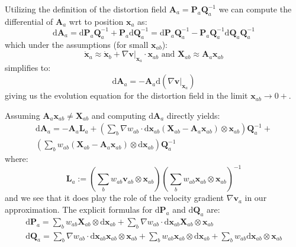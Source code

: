 \documentclass[oneside, a4paper, onecolumn, 11pt]{article}
\renewcommand{\AA}{\mathbf{A}}
\newcommand{\PP}{\mathbf{P}}
\newcommand{\vv}{\mathbf{v}}
\newcommand{\xx}{\mathbf{x}}
\newcommand{\XX}{\mathbf{X}}
\newcommand{\diff}{\mathrm{d}}
\newcommand{\QQ}{\mathbf{Q}}
\newcommand{\LL}{\mathbf{L}}
\begin{document}
\begin{section}
\begin{subsection}
Utilizing the definition of the distortion field $\AA_{a}= \PP_{a} \QQ_a^{-1}$ 
we can compute the differential of $\AA_a$ wrt to position $\xx_a$ as:
\[
    \diff \AA_a = \diff \PP_a \QQ_a^{-1} + \PP_a \diff \QQ_a^{-1} =
    \diff \PP_a \QQ_a^{-1} - \PP_a \QQ_a^{-1} \diff \QQ_a \QQ_a^{-1} 
\]
which under the assumptions (for small $\xx_{ab}$):
\[
    \dot{\xx}_a \approx \dot{\xx}_b + \nabla \vv \Big|_{\xx_a} \cdot \xx_{ab} \text{ and } 
    \XX_{ab} \approx \AA_a \xx_{ab}
\]
simplifies to: 
\[
    \diff \AA_a = - \AA_a \diff (\nabla \vv |_{\xx_a})%
\]
giving us the evolution equation for the distortion field  in the limit $\xx_{ab} \rightarrow 0+$.

Assuming $\AA_{a} \xx_{ab} \neq \XX_{ab}$ and computing $\diff \AA_a$ directly yields:
\begin{equation}\label{eq:dA_full}
    \begin{aligned}
    \diff \AA_a = - \AA_a \LL_a +
    \left(\sum_b \nabla w_{ab} \cdot \diff \xx_{ab} \left(\XX_{ab} - \AA_a \xx_{ab}
    \right) \otimes \xx_{ab}\right)\QQ_a^{-1} +\\
    \left(\sum_b w_{ab} \left(\XX_{ab} - \AA_a \xx_{ab}
    \right) \otimes \diff \xx_{ab}\right)\QQ_a^{-1}
    \end{aligned}
\end{equation}
where:
\begin{equation}
    \LL_a := \left( \sum_b w_{ab} \vv_{ab} \otimes \xx_{ab}\right)
    \left( \sum_b w_{ab} \xx_{ab} \otimes \xx_{ab}\right)^{-1}
\end{equation}
and we see that it does play the role of the velocity gradient $\nabla \vv_a$ in our approximation.
The explicit formulas for $\diff \PP_{a}$ and $\diff \QQ_a$ are:
\[
    \begin{aligned}
    \diff \PP_{a} = \sum_{b} w_{ab} \XX_{ab} \otimes \diff \xx_{ab} +
    \sum_{b} \nabla w_{ab} \cdot \diff \xx_{ab} \XX_{ab} \otimes \xx_{ab} \\
    \diff \QQ_{a} = \sum_{b} \nabla w_{ab} \cdot \diff \xx_{ab} \xx_{ab} \otimes \xx_{ab} + 
    \sum_{b} w_{ab} \xx_{ab} \otimes \diff \xx_{ab} + 
    \sum_{b} w_{ab} \diff \xx_{ab} \otimes \xx_{ab}
    \end{aligned}
\]


\end{subsection}
\end{section}
\end{document}
